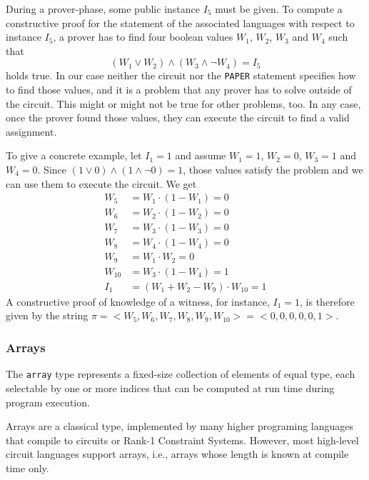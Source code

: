 \begin{example}
During a prover-phase, some public instance $I_5$ must be given. To compute a constructive proof for the statement of the associated languages with respect to instance $I_5$, a prover has to find four boolean values $W_1$, $W_2$, $W_3$ and $W_4$ such that 
$$
\left( W_1 \vee W_2 \right) \wedge (W_3 \wedge \lnot W_4) = I_5
$$ 
holds true. In our case neither the circuit nor the \texttt{PAPER} statement specifies how to find those values, and it is a problem that any prover has to solve outside of the circuit. This might or might not be true for other problems, too. In any case, once the prover found those values, they can execute the circuit to find a valid assignment. 

To give a concrete example, let $I_1=1$ and assume $W_1=1$, $W_2=0$, $W_3=1$ and $W_4=0$. Since 
$\left( 1 \vee 0 \right) \wedge (1 \wedge \lnot 0) = 1$, those values satisfy the problem and we can use them to execute the circuit. We get 
\begin{align*}
W_5 & = W_1 \cdot (1- W_1) = 0\\
W_6 & = W_2 \cdot (1- W_2) = 0 \\
W_7 & = W_3 \cdot (1- W_3) = 0 \\
W_8 & = W_4 \cdot (1- W_4) = 0 \\
W_9 & = W_1\cdot W_2 = 0\\
W_{10} & = W_3 \cdot (1-W_4) = 1\\
I_1 & = (W_1 + W_2 - W_9) \cdot W_{10} = 1
\end{align*}
A constructive proof of knowledge of a witness, for instance, $I_1=1$, is therefore given by the string $\pi=<W_5,W_6,W_7,W_8,W_9,W_{10}>=<0,0,0,0,0,1>$. 
\end{example}
\subsubsection{Arrays} The \texttt{array} type represents a fixed-size collection of elements of equal type, each selectable by one or more indices that can be computed at run time during program execution. 

Arrays are a classical type, implemented by many higher programing languages that compile to circuits or Rank-1 Constraint Systems. However, most high-level circuit languages support  arrays, i.e., arrays whose length is known at compile time only. 

